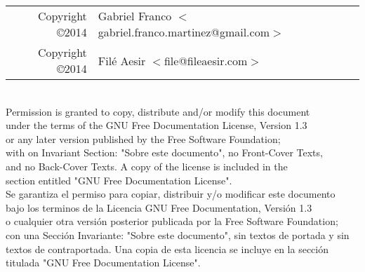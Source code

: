 \begin{flushright}

\vspace*{4cm}


\begin{tabular}{r l}
	Copyright \copyright 2014  & Gabriel Franco $<$gabriel.franco.martinez@gmail.com$>$\\
	Copyright \copyright 2014 & Filé Aesir $<$file@fileaesir.com$>$\\
\end{tabular}\\[1cm]

    Permission is granted to copy, distribute and/or modify this document\\
    under the terms of the GNU Free Documentation License, Version 1.3\\
    or any later version published by the Free Software Foundation;\\
    with on Invariant Section: "Sobre este documento", no Front-Cover Texts,\\
    and no Back-Cover Texts. A copy of the license is included in the\\
    section entitled "GNU Free Documentation License".\\[1cm]


    Se garantiza el permiso para copiar, distribuir y/o modificar este documento\\
bajo los terminos de la Licencia GNU Free Documentation, Versión 1.3\\
o cualquier otra versión posterior publicada por la Free Software Foundation;\\
con una Sección Invariante: "Sobre este documento", sin textos de portada y sin\\
textos de contraportada. Una copia de esta licencia se incluye en la sección \\
titulada "GNU Free Documentation License".

\end{flushright}


